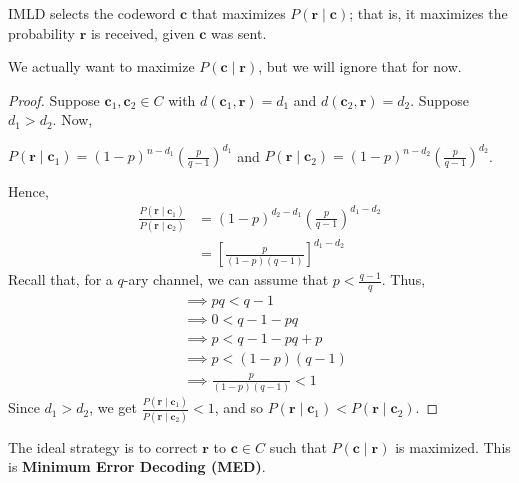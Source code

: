 \begin{thmbox}
    \begin{theorem}
    IMLD selects the codeword $ \bm{c} $ that maximizes $ P(\bm{r}\mid \bm{c})$; that is,
    it maximizes the probability $ \bm{r} $ is received, given $ \bm{c} $ was sent.
\end{theorem} \end{thmbox}
We actually want to maximize $ P(\bm{c}\mid \bm{r}) $, but we will ignore that for now.
\begin{proof}
    Suppose $ \bm{c}_1,\bm{c}_2\in C $ with $ d(\bm{c}_1,\bm{r})=d_1 $
    and $ d(\bm{c}_2,\bm{r})=d_2 $.
    Suppose $ d_1>d_2 $. Now,

    $ P(\bm{r}\mid \bm{c}_1)=(1-p)^{n-d_1}\left( \frac{p}{q-1} \right)^{d_1} $ and
    $ P(\bm{r}\mid \bm{c}_2)=(1-p)^{n-d_2}\left( \frac{p}{q-1} \right)^{d_2} $.

    Hence,
    \begin{align*}
        \frac{P(\bm{r}\mid \bm{c}_1)}{P(\bm{r}\mid \bm{c}_2)}
        &=(1-p)^{d_2-d_1}\left( \frac{p}{q-1}  \right)^{d_1-d_2}\\
        &=\left[ \frac{p}{(1-p)(q-1)}  \right]^{d_1-d_2}
    \end{align*}
    Recall that, for a $ q $-ary channel, we can assume that $ p<\frac{q-1}{q} $. Thus,
    \begin{align*}
        &\implies pq < q-1\\
        &\implies 0 < q-1-pq\\
        &\implies p < q-1-pq+p\\
        &\implies p < (1-p)(q-1)\\
        &\implies \frac{p}{(1-p)(q-1)} < 1
    \end{align*}
    Since $ d_1>d_2 $, we get $ \frac{P(\bm{r}\mid \bm{c}_1)}{P(\bm{r}\mid \bm{c}_2)} < 1 $, and so
    $ P(\bm{r}\mid \bm{c}_1)<P(\bm{r}\mid \bm{c}_2) $.
\end{proof}
The ideal strategy is to correct $ \bm{r} $ to $ \bm{c}\in C $ such that
$ P(\bm{c}\mid \bm{r}) $ is maximized. This is \textbf{Minimum Error Decoding (MED)}.

